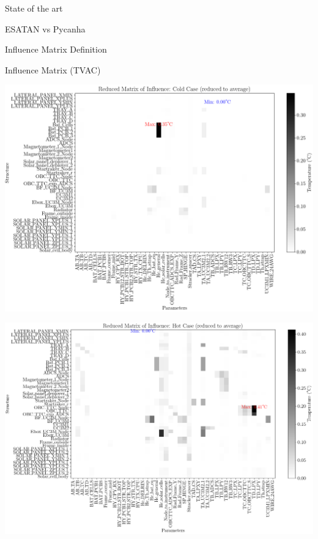 \documentclass{cubeamer}
\begin{document}
\begin{frame}{State of the art}
\begin{minipage}{0.65\textwidth}
\begin{frame}{ESATAN vs Pycanha}
\begin{frame}{ Influence Matrix Definition}
\begin{center}
\end{center}

\end{frame}

\begin{frame}{Influence Matrix (TVAC)}
\begin{center}
    \begin{minipage}{0.475\textwidth}
    \includegraphics[width=1\linewidth]{Figures/TVAC/infmatCC.png}
\end{minipage}
\begin{minipage}{0.475\textwidth}
    \includegraphics[width=1\linewidth]{Figures/TVAC/infmatHC.png}
\end{minipage}
\end{center}

\end{frame}


\end{frame}
\end{minipage}
\end{frame}
\end{document}

